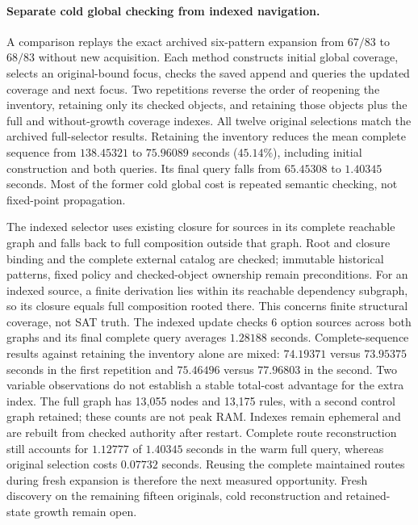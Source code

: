 \documentclass[11pt,a4paper]{article}
\numberwithin{equation}{section}
\theoremstyle{plain}
\theoremstyle{definition}
\theoremstyle{remark}
\begin{document}
\paragraph{Separate cold global checking from indexed navigation.}
A comparison replays the exact archived six-pattern expansion from $67/83$ to
$68/83$ without new acquisition. Each method constructs initial global coverage,
selects an original-bound focus, checks the saved append and queries the updated
coverage and next focus. Two repetitions reverse the order of reopening the
inventory, retaining only its checked objects, and retaining those objects plus
the full and without-growth coverage indexes. All twelve original selections
match the archived full-selector results. Retaining the inventory reduces the
mean complete sequence from $138.45321$ to $75.96089$ seconds
($45.14\%$), including initial construction and both queries. Its final
query falls from $65.45308$ to $1.40345$ seconds. Most of the former
cold global cost is repeated semantic checking, not fixed-point propagation.

The indexed selector uses existing closure for sources in its complete reachable
graph and falls back to full composition outside that graph. Root and closure
binding and the complete external catalog are checked; immutable historical
patterns, fixed policy and checked-object ownership remain preconditions.
For an indexed source, a finite derivation lies within its reachable dependency
subgraph, so its closure equals full composition rooted there. This concerns
finite structural coverage, not SAT truth. The indexed update checks
6 option sources across both graphs and its final complete query averages
$1.28188$ seconds. Complete-sequence results against retaining the inventory alone
are mixed: $74.19371$ versus $73.95375$ seconds in the first repetition and
$75.46496$ versus $77.96803$ in the second. Two variable observations do not
establish a stable total-cost advantage for the extra index. The full graph has
13,055 nodes and 13,175 rules, with a second control graph retained;
these counts are not peak RAM. Indexes remain ephemeral and are rebuilt from
checked authority after restart. Complete route reconstruction still accounts for $1.12777$ of
$1.40345$ seconds in the warm full query, whereas original selection costs
$0.07732$ seconds. Reusing the complete maintained routes during fresh expansion
is therefore the next measured opportunity. Fresh discovery on the remaining
fifteen originals, cold reconstruction and retained-state growth remain open.
\end{document}
